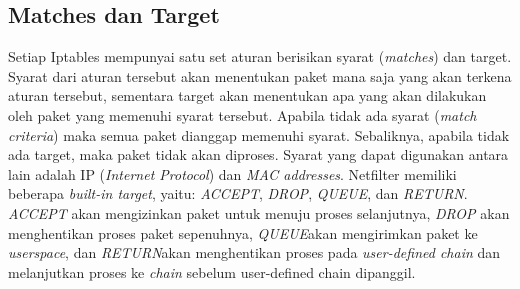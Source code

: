 \subsection{Matches dan Target}
Setiap Iptables mempunyai satu set aturan berisikan syarat (\textit{matches}) dan target. Syarat dari aturan tersebut akan menentukan paket mana saja yang akan terkena aturan tersebut, sementara target akan menentukan apa yang akan dilakukan oleh paket yang memenuhi syarat tersebut. Apabila tidak ada syarat (\textit{match criteria}) maka semua paket dianggap memenuhi syarat. Sebaliknya, apabila tidak ada target, maka paket tidak akan diproses. Syarat yang dapat digunakan antara lain adalah IP (\textit{Internet Protocol}) dan \textit{MAC addresses}.
Netfilter memiliki beberapa \textit{built-in target}, yaitu: \textit{ACCEPT}, \textit{DROP}, \textit{QUEUE}, dan \textit{RETURN}. 
\textit{ACCEPT} akan mengizinkan paket untuk menuju proses selanjutnya,
\textit{DROP} akan menghentikan proses paket sepenuhnya,
\textit{QUEUE}akan mengirimkan paket ke \textit{userspace}, dan 
\textit{RETURN}akan menghentikan proses pada \textit{user-defined chain} dan melanjutkan proses ke \textit{chain} sebelum user-defined chain dipanggil.